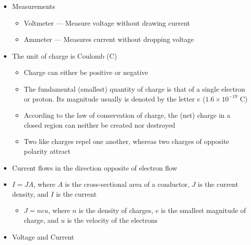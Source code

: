 \begin{itemize}
\begin{itemize}
    \end{itemize}

  \item Measurements

    \begin{itemize}

      \item Voltmeter — Measure voltage without drawing current

      \item Ammeter — Measures current without dropping voltage

    \end{itemize}

  \item The unit of charge is Coulomb (C)

    \begin{itemize}

      \item Charge can either be positive or negative

      \item The fundamental (smallest) quantity of charge is that of a single electron or proton. Its magnitude usually is denoted by the letter $e$ ($1.6\times10^{-19}$ C)

      \item According to the law of conservation of charge, the (net) charge in a closed region can neither be created nor destroyed

      \item Two like charges repel one another, whereas two charges of opposite polarity attract

    \end{itemize}

  \item Current flows in the direction opposite of electron flow

  \item $I=JA$, where $A$ is the cross-sectional area of a conductor, $J$ is the current density, and $I$ is the current

    \begin{itemize}

      \item $J=neu$, where $n$ is the density of charges, $e$ is the smallest magnitude of charge, and $u$ is the velocity of the electrons

    \end{itemize}

  \item Voltage and Current


\end{itemize}
